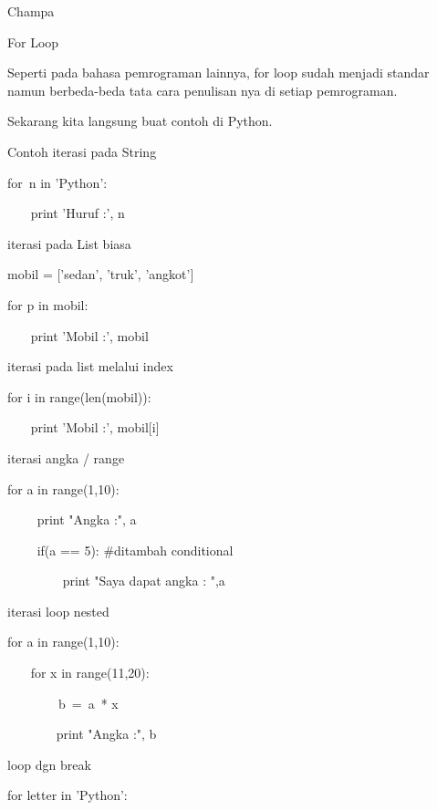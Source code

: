 Champa \par
For Loop \par
Seperti pada bahasa pemrograman lainnya, for loop sudah menjadi standar namun berbeda-beda tata cara penulisan nya di setiap pemrograman. \par
\vspace{12pt}
Sekarang kita langsung buat contoh di Python. $  $ \par
\vspace{12pt}
\vspace{12pt}
Contoh iterasi pada String  \par
\vspace{12pt}
for~n in 'Python':   \par
~~~ print 'Huruf :', n \par
\vspace{12pt}
  \par
iterasi pada List biasa \par
\vspace{12pt}
mobil = ['sedan', 'truk', 'angkot']  \par
for p in mobil: \par
~~~ print 'Mobil :', mobil \par
\vspace{12pt}
\vspace{12pt}
iterasi pada list melalui index \par
for i in range(len(mobil)): \par
~~~ print 'Mobil :', mobil[i] \par
\vspace{12pt}
iterasi angka / range \par
\vspace{12pt}
for a in range(1,10): \par
~~~~ print "Angka :", a \par
~~~~ if(a == 5):  $  \#  $ditambah conditional \par
~~~~~~~~ print "Saya dapat angka : ",a \par
\vspace{12pt}
iterasi loop nested \par
for a in range(1,10): \par
~~~ for x in range(11,20): \par
~~~~~~~~b~=~a~* x      \par
~~~~~~~ print "Angka :", b \par
\vspace{12pt}
loop dgn break \par
for letter in 'Python': \par
